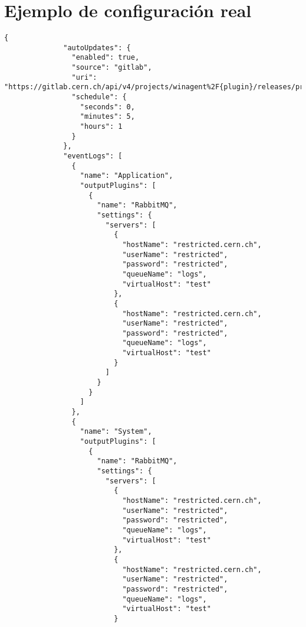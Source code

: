     \section{Ejemplo de configuración real}\label{anx:settings}
        \begin{lstlisting}[style=csharp, caption=Fichero de configuración]
            {
              "autoUpdates": {
                "enabled": true,
                "source": "gitlab",
                "uri": "https://gitlab.cern.ch/api/v4/projects/winagent%2F{plugin}/releases/production",
                "schedule": {
                  "seconds": 0,
                  "minutes": 5,
                  "hours": 1
                }
              },
              "eventLogs": [
                {
                  "name": "Application",
                  "outputPlugins": [
                    {
                      "name": "RabbitMQ",
                      "settings": {
                        "servers": [
                          {
                            "hostName": "restricted.cern.ch",
                            "userName": "restricted",
                            "password": "restricted",
                            "queueName": "logs",
                            "virtualHost": "test"
                          },
                          {
                            "hostName": "restricted.cern.ch",
                            "userName": "restricted",
                            "password": "restricted",
                            "queueName": "logs",
                            "virtualHost": "test"
                          }
                        ]
                      }
                    }
                  ]
                },
                {
                  "name": "System",
                  "outputPlugins": [
                    {
                      "name": "RabbitMQ",
                      "settings": {
                        "servers": [
                          {
                            "hostName": "restricted.cern.ch",
                            "userName": "restricted",
                            "password": "restricted",
                            "queueName": "logs",
                            "virtualHost": "test"
                          },
                          {
                            "hostName": "restricted.cern.ch",
                            "userName": "restricted",
                            "password": "restricted",
                            "queueName": "logs",
                            "virtualHost": "test"
                          }

\end{lstlisting}
